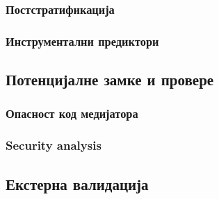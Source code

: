 \documentclass[12pt, a4paper]{article}
\begin{document}
\subsubsection{Постстратификација}
\subsubsection{Инструментални предиктори}
\subsection{Потенцијалне замке и провере}
\subsubsection{Опасност код медијатора}
\subsubsection{Security analysis}
\subsection{Екстерна валидација}
\end{document}
